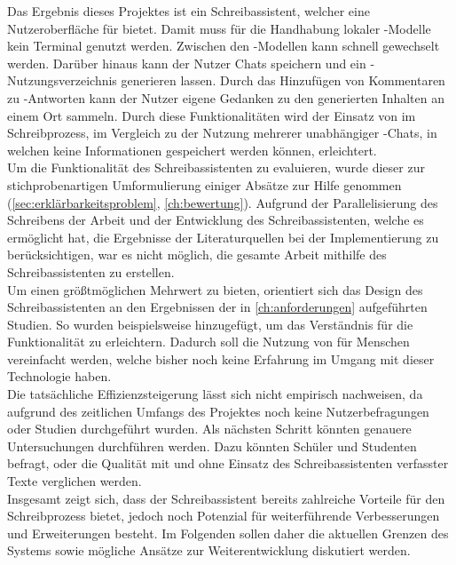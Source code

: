 \documentclass[../main.tex]{subfiles}
\begin{document}
Das Ergebnis dieses Projektes ist ein Schreibassistent, welcher eine Nutzeroberfläche für  bietet. Damit muss für die Handhabung lokaler -Modelle kein Terminal genutzt werden. 
Zwischen den -Modellen kann schnell gewechselt werden. Darüber hinaus kann der Nutzer Chats speichern und ein -Nutzungsverzeichnis generieren lassen. Durch das Hinzufügen von Kommentaren 
zu -Antworten kann der Nutzer eigene Gedanken zu den generierten Inhalten an einem Ort sammeln. Durch diese Funktionalitäten wird der Einsatz von  im Schreibprozess, im Vergleich 
zu der Nutzung mehrerer unabhängiger -Chats, in welchen keine Informationen gespeichert werden können, erleichtert.\\ 
Um die Funktionalität des Schreibassistenten zu evaluieren, wurde dieser zur stichprobenartigen Umformulierung einiger Absätze zur Hilfe genommen (\autoref{sec:erklärbarkeitsproblem}, \autoref{ch:bewertung}). Aufgrund der Parallelisierung des Schreibens der Arbeit und der Entwicklung des Schreibassistenten, welche es ermöglicht hat, die Ergebnisse der Literaturquellen bei der 
Implementierung zu berücksichtigen, war es nicht möglich, die gesamte Arbeit mithilfe des Schreibassistenten zu erstellen. \\
Um einen größtmöglichen Mehrwert zu bieten, orientiert sich das Design des Schreibassistenten an den Ergebnissen der in \autoref{ch:anforderungen} aufgeführten Studien. So wurden beispielsweise 
 hinzugefügt, um das Verständnis für die Funktionalität zu erleichtern. Dadurch soll die Nutzung von  für Menschen vereinfacht werden, welche bisher noch keine Erfahrung im 
Umgang mit dieser Technologie haben.\\
Die tatsächliche Effizienzsteigerung lässt sich nicht empirisch nachweisen, da aufgrund des zeitlichen Umfangs des Projektes noch keine Nutzerbefragungen oder Studien durchgeführt 
wurden. Als nächsten Schritt könnten genauere Untersuchungen durchführen werden. Dazu könnten Schüler und Studenten befragt, oder die Qualität mit und ohne 
Einsatz des Schreibassistenten verfasster Texte verglichen werden.\\ 
Insgesamt zeigt sich, dass der Schreibassistent bereits zahlreiche Vorteile für den Schreibprozess bietet, jedoch noch Potenzial für weiterführende Verbesserungen und Erweiterungen 
besteht. Im Folgenden sollen daher die aktuellen Grenzen des Systems sowie mögliche Ansätze zur Weiterentwicklung diskutiert werden.\\
\end{document}
